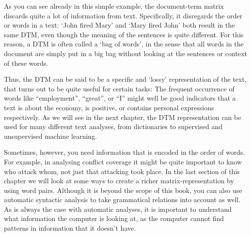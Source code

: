 As you can see already in this simple example, the document-term matrix discards quite a lot of information from text.
Specifically, it disregards the order or words in a text: `John fired Mary' and `Mary fired John' both result in the same DTM,
even though the meaning of the sentences is quite different.
For this reason, a DTM is often called a `bag of words', in the sense that all words in the document are simply put in a big bag
without looking at the sentences or context of these words. 

Thus, the DTM can be said to be a specific and `lossy' representation of the text, that turns out to be quite useful for certain tasks:
The frequent occurrence of words like ``employment'', ``great'', or ``I'' might well be good indicators that a text is about the economy,
is positive, or contains personal expressions respectively.
As we will see in the next chapter, the DTM representation can be used for many different text analyses, from dictionaries to supervised and unsupervised machine learning.

Sometimes, however, you need information that is encoded in the order of words.
For example, in analysing conflict coverage it might be quite important to know who attack whom, not just that attacking took place.
In the last section of this chapter we will look at some ways to create a richer matrix-representation by using word pairs.
Although it is beyond the scope of this book,
you can also use automatic syntactic analysis to take grammatical relations into account as well.
As is always the case with automatic analyses, it is important to understand what information the computer is looking at,
as the computer cannot find patterns in information that it doesn't have.


